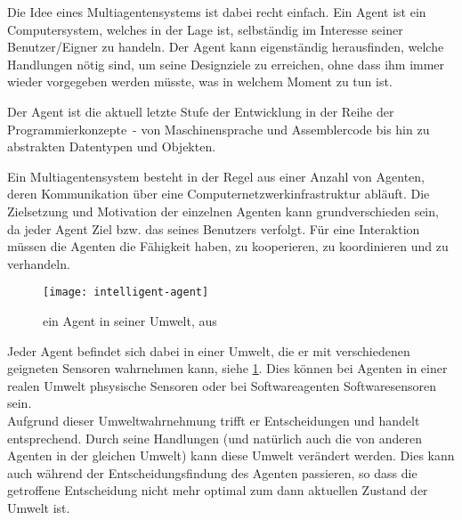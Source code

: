 Die Idee eines Multiagentensystems ist dabei recht einfach.
Ein Agent ist ein Computersystem, welches in der Lage ist, selbständig im Interesse seiner Benutzer/Eigner zu handeln.
Der Agent kann eigenständig herausfinden, welche Handlungen nötig sind, um seine Designziele zu erreichen, ohne dass ihm immer wieder vorgegeben werden müsste, was in welchem Moment zu tun ist.

Der Agent ist die aktuell letzte Stufe der Entwicklung in der Reihe der \mbox{Programmierkonzepte -} von Maschinensprache und Assemblercode bis hin zu abstrakten Datentypen und Objekten.

Ein Multiagentensystem besteht in der Regel aus einer Anzahl von Agenten, deren Kommunikation über eine Computernetzwerkinfrastruktur abläuft.
Die Zielsetzung und Motivation der einzelnen Agenten kann grundverschieden sein, da jeder Agent  Ziel bzw. das seines Benutzers verfolgt.
Für eine Interaktion müssen die Agenten die Fähigkeit haben, zu kooperieren, zu koordinieren und zu verhandeln.

\begin{figure}[hptb]
 \centering
 \texttt{[image: intelligent-agent]}
 \caption[ein Agent in seiner Umwelt]
 		{ein Agent in seiner Umwelt, aus \cite[Figure 2.1]{multiagent}}
 \label{figure:intelligent-agent}
\end{figure}
\noindent
Jeder Agent befindet sich dabei in einer Umwelt, die er mit verschiedenen geigneten Sensoren wahrnehmen kann, siehe \cref{figure:intelligent-agent}.
Dies können bei Agenten in einer realen Umwelt phsysische Sensoren oder bei Softwareagenten Softwaresensoren sein.
\\
Aufgrund dieser Umweltwahrnehmung trifft er Entscheidungen und handelt entsprechend.
Durch seine Handlungen (und natürlich auch die von anderen Agenten in der gleichen Umwelt) kann diese Umwelt verändert werden.
Dies kann auch während der Entscheidungsfindung des Agenten passieren, so dass die getroffene Entscheidung nicht mehr optimal zum dann aktuellen Zustand der Umwelt ist.

